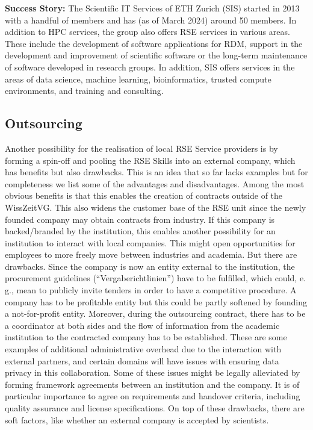 \documentclass[a4paper]{article}
\newcommand*{\eg}{e.\,g.,\xspace}
\begin{document}
\begin{mdframed}
\textbf{Success Story:} The Scientific IT Services of ETH Zurich (SIS) started in 2013 with a handful of members and has (as of March 2024) around 50 members.
In addition to HPC services, the group also offers RSE services in various areas.
These include the development of software applications for RDM, support in the development and improvement of scientific software or the long-term maintenance of software developed in research groups.
In addition, SIS offers services in the areas of data science, machine learning, bioinformatics, trusted compute environments, and training and consulting.
\end{mdframed}

\subsection{Outsourcing}

Another possibility for the realisation of local RSE Service providers is by forming a spin-off and pooling the RSE Skills into an external company, which has benefits but also drawbacks.
This is an idea that so far lacks examples but for completeness we list some of the advantages and disadvantages.
Among the most obvious benefits is that this enables the creation of contracts outside of the WissZeitVG.\@
This also widens the customer base of the RSE unit since the newly founded company may obtain contracts from industry.
If this company is backed/branded by the institution, this enables another possibility for an institution to interact with local companies.
This might open opportunities for employees to more freely move between industries and academia.
But there are drawbacks.
Since the company is now an entity external to the institution, the procurement guidelines (“Vergaberichtlinien”) have to be fulfilled, which could, \eg{} mean to publicly invite tenders in order to have a competitive procedure.
A company has to be profitable entity but this could be partly softened by founding a not-for-profit entity.
Moreover, during the outsourcing contract, there has to be a coordinator at both sides and the flow of information from the academic institution to the contracted company has to be established.
These are some examples of additional administrative overhead due to the interaction with external partners, and certain domains will have issues with ensuring data privacy in this collaboration.
Some of these issues might be legally alleviated by forming framework agreements between an institution and the company.
It is of particular importance to agree on requirements and handover criteria, including quality assurance and license specifications.
On top of these drawbacks, there are soft factors, like whether an external company is accepted by scientists.
\end{document}
